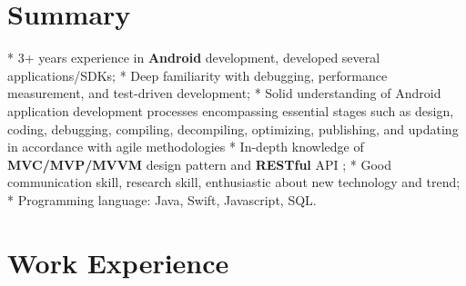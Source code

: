 \documentclass[10pt,letterpaper,sans]{moderncv}        %
\begin{document}
\makecvtitle



\vspace*{-1.3cm}
\section{Summary}
\cvitem{} {* 3+ years experience in \textbf{Android} development, developed several applications/SDKs;}
\cvitem{} {* Deep familiarity with debugging, performance measurement, and test-driven development; }
\cvitem{} {* Solid understanding of Android application development processes encompassing essential stages such as design, coding, debugging, compiling, decompiling, optimizing, publishing, and updating in accordance with agile methodologies}
\cvitem{} {* In-depth knowledge of \textbf{MVC/MVP/MVVM} design pattern and \textbf{RESTful} API ;}
\cvitem{} {* Good communication skill, research skill, enthusiastic about new technology and trend; }
\cvitem{} {* Programming language: Java, Swift, Javascript, SQL.}

\section{Work Experience}
\end{document}
